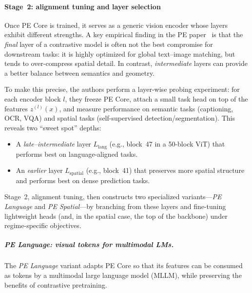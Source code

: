 \begin{enrichment}
\begin{enrichment}
		\paragraph{Stage~2: alignment tuning and layer selection}
		
		Once PE Core is trained, it serves as a generic vision encoder whose layers exhibit different strengths. A key empirical finding in the PE paper~\cite{bolya2025_perceptionencoder} is that the \emph{final} layer of a contrastive model is often not the best compromise for downstream tasks: it is highly optimized for global text–image matching, but tends to over-compress spatial detail. In contrast, \emph{intermediate} layers can provide a better balance between semantics and geometry.
		
		To make this precise, the authors perform a layer-wise probing experiment: for each encoder block \(l\), they freeze PE Core, attach a small task head on top of the features \(z^{(l)}(x)\), and measure performance on semantic tasks (captioning, OCR, VQA) and spatial tasks (self-supervised detection/segmentation). This reveals two “sweet spot” depths:
		\begin{itemize}
			\item A \emph{late–intermediate} layer \(L_{\text{lang}}\) (e.g., block~47 in a 50-block ViT) that performs best on language-aligned tasks. 
			\item An \emph{earlier} layer \(L_{\text{spatial}}\) (e.g., block~41) that preserves more spatial structure and performs best on dense prediction tasks.
		\end{itemize}
		Stage~2, alignment tuning, then constructs two specialized variants—\emph{PE Language} and \emph{PE Spatial}—by branching from these layers and fine-tuning lightweight heads (and, in the spatial case, the top of the backbone) under regime-specific objectives.
		
		\subparagraph*{PE Language: visual tokens for multimodal LMs.}
		
		The \emph{PE Language} variant adapts PE Core so that its features can be consumed as tokens by a multimodal large language model (MLLM), while preserving the benefits of contrastive pretraining.
		

\end{enrichment}
\end{enrichment}
